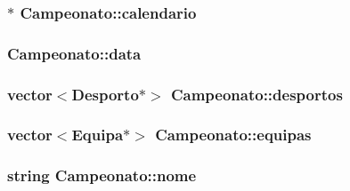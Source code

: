 \subsubsection[{calendario}]{$\ast$ Campeonato\+::calendario\hspace{0.3cm}{\ttfamily [private]}}\label{class_campeonato_af4bf75bd6daa812d16ab2be60c356f21}
\hypertarget{class_campeonato_ab9a3d4a07de27528556e0ffebda3ba97}{}
\subsubsection[{data}]{ Campeonato\+::data\hspace{0.3cm}{\ttfamily [private]}}\label{class_campeonato_ab9a3d4a07de27528556e0ffebda3ba97}
\hypertarget{class_campeonato_ab65bbad67e796b73176b696457ea39ea}{}
\subsubsection[{desportos}]{\setlength{\rightskip}{0pt plus 5cm}vector$<${\bf Desporto}$\ast$$>$ Campeonato\+::desportos\hspace{0.3cm}{\ttfamily [private]}}\label{class_campeonato_ab65bbad67e796b73176b696457ea39ea}
\hypertarget{class_campeonato_ab677d5217856ce0ff2887a0e335caf2d}{}
\subsubsection[{equipas}]{\setlength{\rightskip}{0pt plus 5cm}vector$<${\bf Equipa}$\ast$$>$ Campeonato\+::equipas\hspace{0.3cm}{\ttfamily [private]}}\label{class_campeonato_ab677d5217856ce0ff2887a0e335caf2d}
\hypertarget{class_campeonato_a670b0857b7a8bc3c5dbf0f927ee192fe}{}
\subsubsection[{nome}]{\setlength{\rightskip}{0pt plus 5cm}string Campeonato\+::nome\hspace{0.3cm}{\ttfamily [private]}}\label{class_campeonato_a670b0857b7a8bc3c5dbf0f927ee192fe}
\hypertarget{class_campeonato_a9f7011b322e9ae5fe6504ca5946268bf}{}
